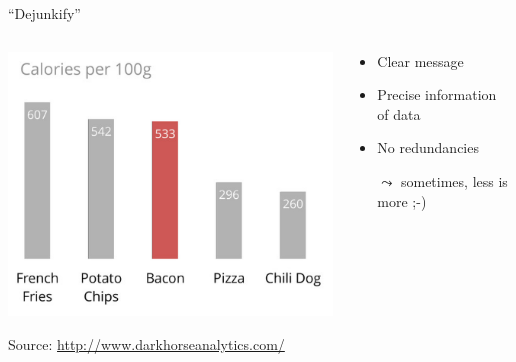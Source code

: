 \documentclass[aspectratio=169]{../latex_main/tntbeamer}  %
\begin{document}
	\begin{frame}{``Dejunkify''}

        \begin{columns}
            \begin{column}{0.5\textwidth}
                \vspace{-2em}
                \includegraphics[width=1\textwidth]{04_visualization/figure/good_figure.png}        
                
                {
                \footnotesize
                Source: \url{http://www.darkhorseanalytics.com/}
                }
                
            \end{column}
        
            \begin{column}{0.5\textwidth}
            
            \begin{itemize}
                \item Clear message
                \item Precise information of data
                \item No redundancies
                \item[$\leadsto$] sometimes, less is more ;-)
            \end{itemize}
            
            \end{column}
            
        \end{columns}
	    
	\end{frame}
	
\end{document}

